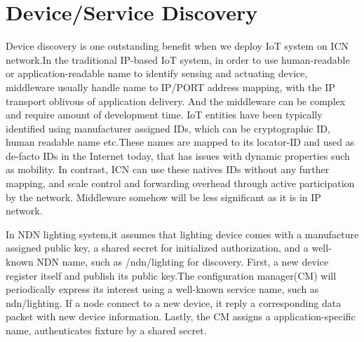 \section{Device/Service Discovery}\label{sec:discovery}
Device discovery is one outstanding benefit when we deploy IoT system on ICN network.In the traditional IP-based IoT system, in order to use human-readable or application-readable name to identify sensing and actuating device, middleware usually handle name to IP/PORT address mapping, with the IP transport oblivous of application delivery. And the middleware can be complex and require amount of development time. IoT entities have been typically identified using manufacturer assigned IDs, which can be cryptographic ID, human readable name etc.These names are mapped to its locator-ID and used as de-facto IDs in the Internet today, that has issues with dynamic properties such as mobility. In contrast, ICN can use these natives IDs without any further mapping, and scale control and forwarding overhead through active participation by the network. Middleware somehow will be less significant as it is in IP network.  

In NDN lighting system\cite{},it assumes that lighting device comes with a manufacture assigned public key, a shared secret for initialized authorization, and a well-known NDN name, such as /ndn/lighting for discovery. First, a new device register itself and publish its public key.The configuration manager(CM) will periodically express its interest using a well-known service name, such as ndn/lighting. If a node connect to a new device, it reply a corresponding data packet with new device information. Lastly, the CM assigns a application-specific name, authenticates fixture by a shared secret.    

